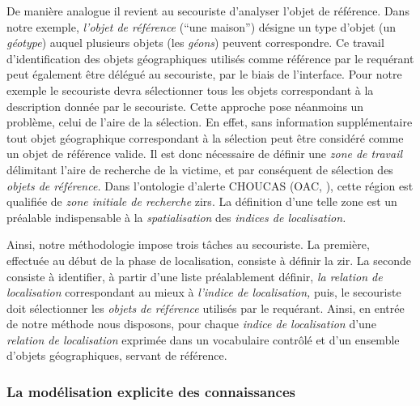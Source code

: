 De manière analogue il revient au secouriste d'analyser l'objet de
référence. Dans notre exemple, \emph{l'objet de référence}
(\enquote{une maison}) désigne un type d'objet (\ie un \emph{géotype})
auquel plusieurs objets (\ie les \emph{géons}) peuvent
correspondre. Ce travail d'identification des objets géographiques
utilisés comme référence par le requérant peut également être délégué
au secouriste, par le biais de l'interface. Pour notre exemple le
secouriste devra sélectionner tous les objets correspondant à la
description donnée par le secouriste. Cette approche pose néanmoins un
problème, celui de l'aire de la sélection. En effet, sans information
supplémentaire tout objet géographique correspondant à la sélection
peut être considéré comme un objet de référence valide. Il est donc
nécessaire de définir une \emph{zone de travail} délimitant l'aire de
recherche de la victime, et par conséquent de sélection des
\emph{objets de référence.} Dans l'ontologie d'alerte CHOUCAS (OAC,
\cite{Viry2019}), cette région est qualifiée de \emph{zone initiale de
  recherche} \acp{zir}. La définition d'une telle zone est un préalable
indispensable à la \emph{spatialisation} des \emph{indices de
  localisation.}

Ainsi, notre méthodologie impose trois tâches au secouriste. La
première, effectuée au début de la phase de localisation, consiste à
définir la \ac{zir}. La seconde consiste à identifier, à partir d'une liste
préalablement définir, \emph{la relation de localisation}
correspondant au mieux à \emph{l'indice de localisation,} puis, le
secouriste doit sélectionner les \emph{objets de référence} utilisés
par le requérant.
%
Ainsi, en entrée de notre méthode nous disposons, pour chaque
\emph{indice de localisation} d'une \emph{relation de localisation}
exprimée dans un vocabulaire contrôlé et d'un ensemble d'objets
géographiques, servant de référence.



\subsubsection{La modélisation explicite des connaissances}

